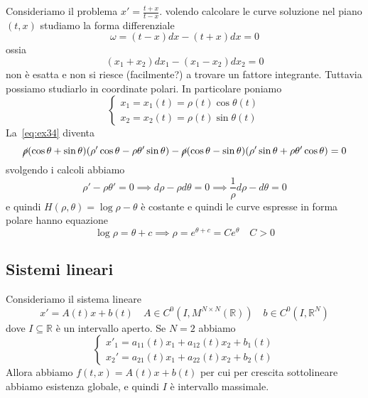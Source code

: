 \begin{example}
    Consideriamo il problema \(\displaystyle x' = \frac{t + x}{t-x}\).
    volendo calcolare le curve soluzione nel piano \((t, x)\) studiamo la forma
    differenziale
\[
    \omega = {(t - x)}dx - {(t + x)}dx = 0
\]
    ossia
    \begin{equation}\label{eq:ex34}
        {(x_{1} + x_{2})}dx_{1} - {(x_{1} - x_{2})}dx_{2} = 0
    \end{equation}
    non è esatta e non si riesce (facilmente?) a trovare un fattore integrante.
    Tuttavia possiamo studiarlo in coordinate polari. In particolare poniamo
\[
    \begin{cases}
        x_{1} = x_{1}{(t)} = \rho{(t)} \cos \theta{(t)} \\
        x_{2} = x_{2}{(t)} = \rho{(t)} \sin\theta{(t)}
    \end{cases}
\]
    La~\eqref{eq:ex34} diventa
\[
    \cancel{\rho}{(\cos \theta + \sin \theta)} {(\rho' \cos \theta - \rho
    \theta'\sin\theta)} - \cancel{\rho}{(\cos \theta - \sin \theta)} {(\rho' \sin \theta
    + \rho \theta' \cos \theta)} = 0
\]
    svolgendo i calcoli abbiamo 
\[
    \rho' - \rho \theta' = 0 \implies d\rho - \rho d\theta = 0  \implies
    \frac{1}{\rho} d\rho - d\theta = 0
\]
    e quindi \(H{(\rho, \theta)} = \log \rho - \theta\) è costante e quindi le
    curve espresse in forma polare hanno equazione
\[
    \log \rho = \theta + c \implies \rho = e^{\theta + c} = C e^{\theta} \quad
    C > 0
\]
\end{example}

\subsection{Sistemi lineari}
Consideriamo il sistema lineare
\begin{equation}\label{eq:sist_lin}
    x' = A{(t)}x + b{(t)} \quad
    A \in C^{0}{(I, M^{N \times N}{(\mathbb{R})})} \quad b \in C^{0}{(I,
    \mathbb{R}^{N})}
\end{equation}
dove \(I \subseteq \mathbb{R} \) è un intervallo aperto.
Se \(N = 2\)  abbiamo
\begin{equation}\label{eq:sist_lin_2}
    \begin{cases}
    x'_1 = a_{11}{(t)}x_{1} + a_{12}{(t)}x_{2} + b_{1}{(t)} \\
    x_{2}' = a_{21}{(t)}x_{1} + a_{22}{(t)}x_{2} + b_{2}{(t)}
    \end{cases}
\end{equation}
Allora abbiamo \(f{(t, x)} = A{(t)}x + b{(t)}\) per cui per crescita
sottolineare abbiamo esistenza globale, e quindi \(I\) è intervallo massimale.

